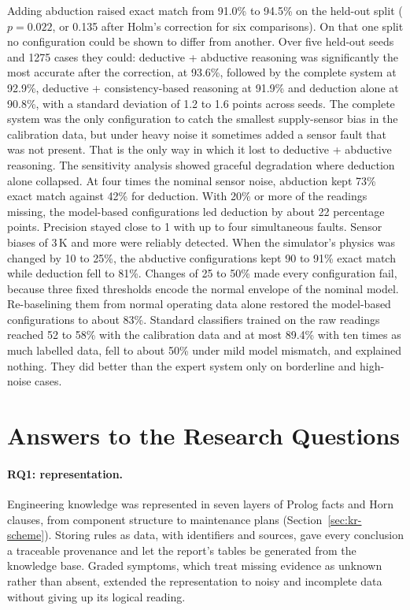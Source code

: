 Adding abduction raised exact match from 91.0\% to 94.5\% on the held-out split ($p = 0.022$, or 0.135 after Holm's correction for six comparisons). On that one split no configuration could be shown to differ from another. Over five held-out seeds and 1275 cases they could: deductive + abductive reasoning was significantly the most accurate after the correction, at 93.6\%, followed by the complete system at 92.9\%, deductive + consistency-based reasoning at 91.9\% and deduction alone at 90.8\%, with a standard deviation of 1.2 to 1.6 points across seeds. The complete system was the only configuration to catch the smallest supply-sensor bias in the calibration data, but under heavy noise it sometimes added a sensor fault that was not present. That is the only way in which it lost to deductive + abductive reasoning. The sensitivity analysis showed graceful degradation where deduction alone collapsed. At four times the nominal sensor noise, abduction kept 73\% exact match against 42\% for deduction. With 20\% or more of the readings missing, the model-based configurations led deduction by about 22 percentage points. Precision stayed close to 1 with up to four simultaneous faults. Sensor biases of 3\,K and more were reliably detected. When the simulator's physics was changed by 10 to 25\%, the abductive configurations kept 90 to 91\% exact match while deduction fell to 81\%. Changes of 25 to 50\% made every configuration fail, because three fixed thresholds encode the normal envelope of the nominal model. Re-baselining them from normal operating data alone restored the model-based configurations to about 83\%. Standard classifiers trained on the raw readings reached 52 to 58\% with the calibration data and at most 89.4\% with ten times as much labelled data, fell to about 50\% under mild model mismatch, and explained nothing. They did better than the expert system only on borderline and high-noise cases.

\section{Answers to the Research Questions}
\label{sec:answers}

\paragraph{RQ1: representation.} Engineering knowledge was represented in seven layers of Prolog facts and Horn clauses, from component structure to maintenance plans (Section~\ref{sec:kr-scheme}). Storing rules as data, with identifiers and sources, gave every conclusion a traceable provenance and let the report's tables be generated from the knowledge base. Graded symptoms, which treat missing evidence as unknown rather than absent, extended the representation to noisy and incomplete data without giving up its logical reading.

